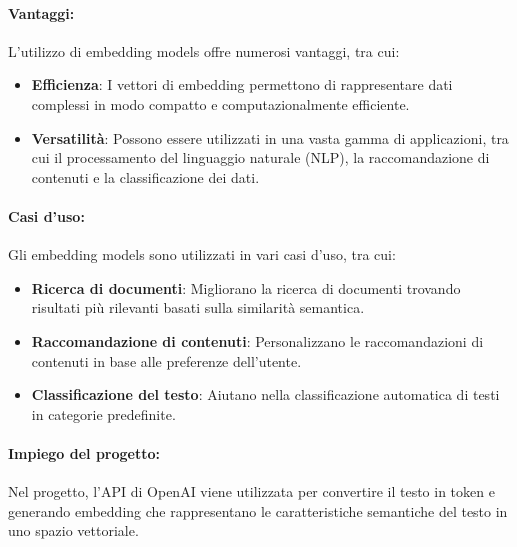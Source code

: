\paragraph{Vantaggi:}
L'utilizzo di embedding models offre numerosi vantaggi, tra cui:
\begin{itemize}
    \item \textbf{Efficienza}: I vettori di embedding permettono di rappresentare dati complessi in modo compatto e computazionalmente efficiente.
    \item \textbf{Versatilità}: Possono essere utilizzati in una vasta gamma di applicazioni, tra cui il processamento del linguaggio naturale (NLP), la raccomandazione di contenuti e la classificazione dei dati.
\end{itemize}

\paragraph{Casi d'uso:}
Gli embedding models sono utilizzati in vari casi d'uso, tra cui:
\begin{itemize}
    \item \textbf{Ricerca di documenti}: Migliorano la ricerca di documenti trovando risultati più rilevanti basati sulla similarità semantica.
    \item \textbf{Raccomandazione di contenuti}: Personalizzano le raccomandazioni di contenuti in base alle preferenze dell'utente.
    \item \textbf{Classificazione del testo}: Aiutano nella classificazione automatica di testi in categorie predefinite.
\end{itemize}



\paragraph{Impiego del progetto:}
Nel progetto, l'API di OpenAI viene utilizzata per convertire il testo in token e generando embedding che rappresentano le caratteristiche semantiche del testo in uno spazio vettoriale.



